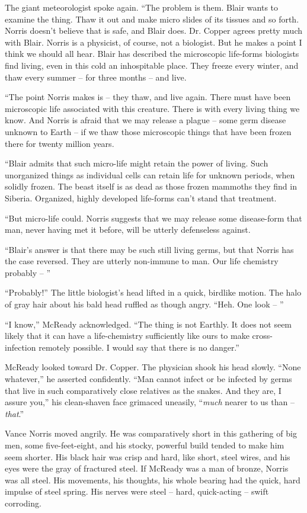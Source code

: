 \documentclass[letterpaper,openany,12pt]{memoir}		%
\begin{document}
The giant meteorologist spoke again. ``The problem is them. Blair wants to
examine the thing. Thaw it out and make micro slides of its tissues and so
forth. Norris doesn't believe that is safe, and Blair does. Dr. Copper agrees
pretty much with Blair. Norris is a physicist, of course, not a biologist. But
he makes a point I think we should all hear. Blair has described the microscopic
life-forms biologists find living, even in this cold an inhospitable place. They
freeze every winter, and thaw every summer -- for three months -- and live.

``The point Norris makes is -- they thaw, and live again. There must have been
microscopic life associated with this creature. There is with every living thing
we know. And Norris is afraid that we may release a plague -- some germ disease
unknown to Earth -- if we thaw those microscopic things that have been frozen
there for twenty million years.

``Blair admits that such micro-life might retain the power of living. Such
unorganized things as individual cells can retain life for unknown periods, when
solidly frozen. The beast itself is as dead as those frozen mammoths they find
in Siberia. Organized, highly developed life-forms can't stand that treatment.

``But micro-life could. Norris suggests that we may release some disease-form
that man, never having met it before, will be utterly defenseless against.

``Blair's answer is that there may be such still living germs, but that Norris
has the case reversed. They are utterly non-immune to man. Our life chemistry
probably -- ''

``Probably!'' The little biologist's head lifted in a quick, birdlike motion.
The halo of gray hair about his bald head ruffled as though angry. ``Heh. One
look -- ''

``I know,'' McReady acknowledged. ``The thing is not Earthly. It does not seem
likely that it can have a life-chemistry sufficiently like ours to make
cross-infection remotely possible. I would say that there is no danger.''

McReady looked toward Dr. Copper. The physician shook his head slowly. ``None
whatever,'' he asserted confidently. ``Man cannot infect or be infected by germs
that live in such comparatively close relatives as the snakes. And they are, I
assure you,'' his clean-shaven face grimaced uneasily, ``\emph{much} nearer to
us than -- \emph{that}.''

Vance Norris moved angrily. He was comparatively short in this gathering of big
men, some five-feet-eight, and his stocky, powerful build tended to make him
seem shorter. His black hair was crisp and hard, like short, steel wires, and
his eyes were the gray of fractured steel. If McReady was a man of bronze,
Norris was all steel. His movements, his thoughts, his whole bearing had the
quick, hard impulse of steel spring. His nerves were steel -- hard, quick-acting
-- swift corroding.
\end{document}
